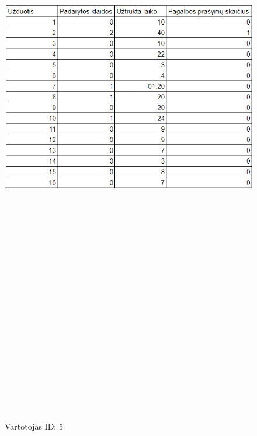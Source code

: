 \documentclass[oneside]{VUMIFPSkursinis}
\begin{document}
	\begin{figure}[ht]
			\centering
			\includegraphics[width=15cm,height=60cm,keepaspectratio]{5.png}
			\caption{ Vartotojas ID: 5}
	\end{figure}
\pagebreak
\end{document}
